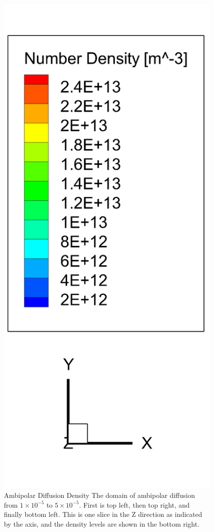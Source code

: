 \begin{figure}
\begin{minipage}[b]{0.2\textwidth}
    \includegraphics[width=\textwidth]{figures/legend.png}
  \end{minipage}
  \caption[Ambipolar Diffusion Density]{Ambipolar Diffusion Density \textmd{The domain of ambipolar diffusion from \(1\times10^{-5}\) to \(5\times10^{-5}\). First is top left, then top right, and finally bottom left. This is one slice in the Z direction as indicated by the axis, and the density levels are shown in the bottom right.}}
  \label{fig:ambidiff}
\end{figure}


